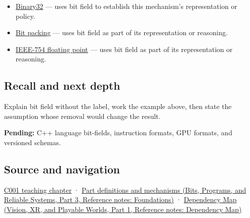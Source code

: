 \hypertarget{appendix-ac697f5c66e8-used-by}{}

\begin{itemize}
\item
  \hyperref[appendix-5057f9ad327f]{Binary32} --- uses bit field to establish this mechanism's representation or policy.
\item
  \hyperref[appendix-1f9963e1a5d1]{Bit packing} --- uses bit field as part of its representation or reasoning.
\item
  \hyperref[appendix-343615f49ddf]{IEEE-754 floating point} --- uses bit field as part of its representation or reasoning.
\end{itemize}

\subsection{Recall and next depth}\label{appendix-ac697f5c66e8-recall-and-next-depth}

\hypertarget{appendix-ac697f5c66e8-recall-and-next-depth}{}

Explain bit field without the label, work the example above, then state the assumption whose removal would change the result.

\textbf{Pending:} C++ language bit-fields, instruction formats, GPU formats, and versioned schemas.

\subsection{Source and navigation}\label{appendix-ac697f5c66e8-source-and-navigation}

\hypertarget{appendix-ac697f5c66e8-source-and-navigation}{}

\hyperref[01-foundations-i-ch001-from-a-signal-to-an-interpretation]{C001 teaching chapter} · \href{../01-Bits-Programs-and-Reliable-Systems-P03/main.pdf\#appendix-fd090d982a15}{Part definitions and mechanisms (Bits, Programs, and Reliable Systems, Part 3, Reference notes: Foundations)} · \href{../07-Vision-XR-and-Playable-Worlds-P01/main.pdf\#appendix-4ad47bdd269a}{Dependency Map (Vision, XR, and Playable Worlds, Part 1, Reference notes: Dependency Map)}
